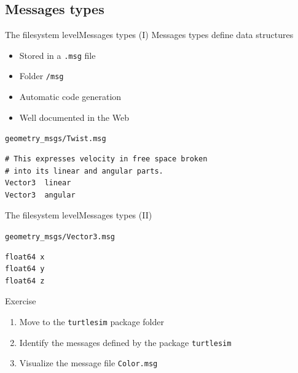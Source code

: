 \documentclass[10pt,compress]{beamer} %
\begin{document}
\subsection{Messages types}
\begin{frame}[fragile]{The filesystem level}{Messages types (I)}
	Messages types define data structures 
  	\begin{itemize}
		\item Stored in a \texttt{.msg} file
		\item Folder \texttt{/msg}
		\item Automatic code generation
		\item Well documented in the Web
	\end{itemize}
	\begin{exampleblock}{\texttt{geometry\_msgs/Twist.msg}}
	\begin{verbatim}
# This expresses velocity in free space broken
# into its linear and angular parts.
Vector3  linear
Vector3  angular
\end{verbatim}
	\end{exampleblock}
\end{frame}

\begin{frame}[fragile]{The filesystem level}{Messages types (II)}
	\begin{exampleblock}{\texttt{geometry\_msgs/Vector3.msg}}
	\begin{verbatim}
float64 x
float64 y
float64 z
\end{verbatim}
	\end{exampleblock}

	\begin{block}{Exercise}
	\begin{enumerate}
		\item Move to the \texttt{turtlesim} package folder
		\item Identify the messages defined by the package \texttt{turtlesim}
		\item Visualize the message file \texttt{Color.msg}
	\end{enumerate}
	\end{block}
\end{frame}
\end{document}
